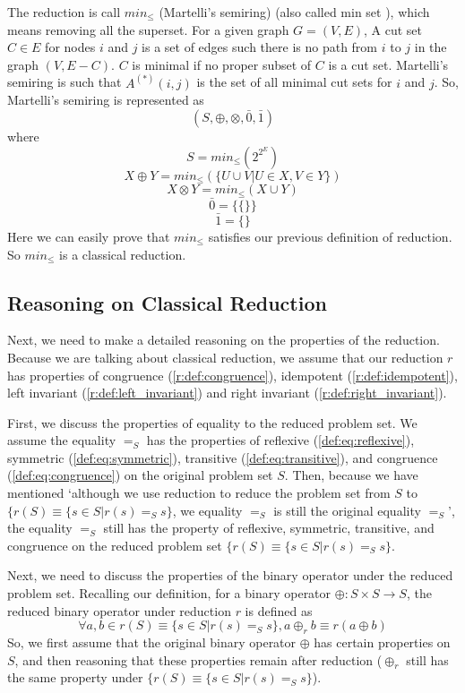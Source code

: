 \documentclass[a4paper,12pt,twoside,openright]{report}
\begin{document}
The reduction is call $min_{\leq}$ (Martelli’s semiring)\cite{martelli_gaussian_1976} (also called min set \cite{griffin_2017}), which means removing all the superset. 
For a given graph $G = (V,E)$, A cut set $C \in E$ for nodes $i$ and $j$ is a set of edges such there is no path from $i$ to $j$ in the graph $(V, E - C)$. $C$ is minimal if no proper subset of $C$ is a cut set. Martelli’s semiring is such that $A^{(*)}(i, j)$ is the set of all minimal cut sets for $i$ and $j$. 
So, Martelli’s semiring is represented as \[(S,\oplus,\otimes,\bar0,\bar1)\] where \[S = min_\leq(2^{2^E})\] \[X\oplus Y = min_\leq(\{U \cup V | U \in X, V \in Y\})\] \[X\otimes Y = min_\leq(X \cup Y)\] \[\bar0 = \{\{\}\}\] \[\bar1 = \{\}\]
Here we can easily prove that $min_\leq$ satisfies our previous definition of reduction. So $min_\leq$ is a classical reduction.
\subsection{Reasoning on Classical Reduction}
Next, we need to make a detailed reasoning on the properties of the reduction.
Because we are talking about classical reduction, we assume that our reduction $r$ has properties of congruence (\ref{r:def:congruence}), idempotent (\ref{r:def:idempotent}), left invariant (\ref{r:def:left_invariant}) and right invariant (\ref{r:def:right_invariant}).

First, we discuss the properties of equality to the reduced problem set. We assume the equality $=_S$ has the properties of reflexive (\ref{def:eq:reflexive}), symmetric (\ref{def:eq:symmetric}), transitive (\ref{def:eq:transitive}), and congruence (\ref{def:eq:congruence}) on the original problem set $S$.
Then, because we have mentioned ‘although we use reduction to reduce the problem set from $S$ to $\{r(S) \equiv \{s \in S | r(s) =_S s\} $, we equality $=_S$ is still the original equality $=_S$’, the equality $=_S$ still has the property of reflexive, symmetric, transitive, and congruence on the reduced problem set $\{r(S) \equiv \{s \in S | r(s) =_S s\}$.

Next, we need to discuss the properties of the binary operator under the reduced problem set. 
Recalling our definition, for a binary operator $\oplus : S \times S \rightarrow S$, the reduced binary operator under reduction $r$ is defined as \[\forall a, b \in r(S) \equiv \{s \in S | r(s) =_S s\}, a \oplus_r b \equiv r(a \oplus b)\]
So, we first assume that the original binary operator $\oplus$ has certain properties on $S$, and then reasoning that these properties remain after reduction ($\oplus_r$ still has the same property under $\{r(S) \equiv \{s \in S | r(s) =_S s\}$).
\end{document}
